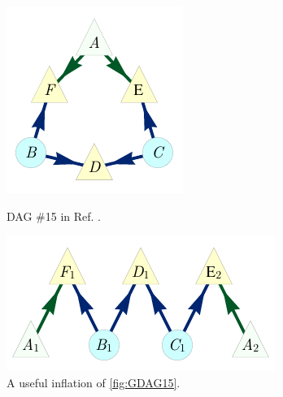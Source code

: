 {\begin{figure}[b]
\centering
\begin{minipage}[t]{0.4\linewidth}
\centering
\includegraphics[scale=1]{scen15DAGV2.pdf}
\caption{DAG \#15 in Ref. \cite{pusey2014gdag}.}\label{fig:GDAG15}
\end{minipage}
\hfill
\begin{minipage}[t]{0.5\linewidth}
\centering
\includegraphics[scale=1]{scen15InflationDAGV2.pdf}
\caption{A useful inflation of \cref{fig:GDAG15}.}\label{fig:Inflated15}
\end{minipage}
\end{figure}

}
